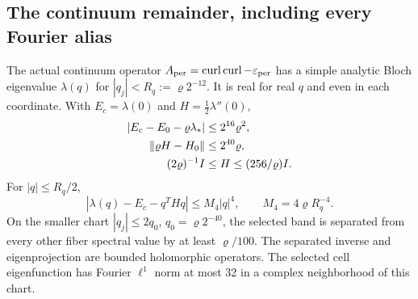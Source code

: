 \subsection{The continuum remainder, including every Fourier alias}
\begin{lemma}
\label{c:lem:edge}
The actual continuum operator $A_{\rm per}=\operatorname{curl}\operatorname{curl}-\varepsilon_{\rm per}$
has a simple analytic Bloch eigenvalue $\lambda(q)$ for
$|q_j|<R_q:=\varrho2^{-12}$. It is real for real $q$ and even in each
coordinate. With $E_c=\lambda(0)$ and $H=\tfrac12\lambda''(0)$,
\begin{align}
 |E_c-E_0-\varrho\lambda_*|&\le2^{16}\varrho^2,\\
 \left\lVert \varrho H-H_0\right\rVert&\le2^{40}\varrho,\\
 (2\varrho)^{-1}I&\le H\le(256/\varrho)I.              \label{c:eq:edgebounds}
\end{align}
For $|q|\le R_q/2$,
\begin{equation}
 |\lambda(q)-E_c-q^THq|\le M_4|q|^4,
 \qquad M_4=4\varrho R_q^{-4}.                       \label{c:eq:quartic}
\end{equation}
On the smaller chart $|q_j|\le2q_0$, $q_0=\varrho2^{-40}$, the selected
band is separated from every other fiber spectral value by at least
$\varrho/100$. The separated inverse and eigenprojection are bounded
holomorphic operators. The selected cell eigenfunction has Fourier
$\ell^1$ norm at most 32 in a complex neighborhood of this chart.
\end{lemma}
